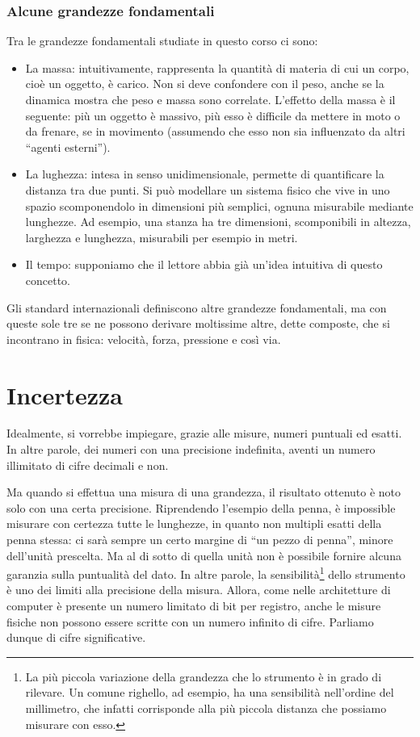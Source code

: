 \subsubsection{Alcune grandezze fondamentali}
Tra le grandezze fondamentali studiate in questo corso ci sono:
\begin{itemize}
    \item La massa: intuitivamente, rappresenta la quantità di
    materia di cui un corpo, cioè un oggetto, è carico. Non si
    deve confondere con il peso, anche se la dinamica mostra che
    peso e massa sono correlate. L'effetto della massa è il seguente:
    più un oggetto è massivo, più
    esso è difficile da mettere in moto o da frenare, se in
    movimento (assumendo che esso non sia influenzato da altri
    ``agenti esterni'').

    \item La lughezza: intesa in senso unidimensionale, permette
    di quantificare la distanza tra due punti. Si può modellare
    un sistema fisico che vive in uno spazio scomponendolo in
    dimensioni più semplici, ognuna misurabile mediante lunghezze.
    Ad esempio, una stanza ha tre dimensioni, scomponibili in
    altezza, larghezza e lunghezza, misurabili per esempio in
    metri.

    \item Il tempo: supponiamo che il lettore abbia già un'idea
    intuitiva di questo concetto.
\end{itemize}

\noindent Gli standard internazionali definiscono altre grandezze
fondamentali, ma con queste sole tre se ne possono derivare moltissime
altre, dette composte, che si incontrano in fisica: velocità, forza,
pressione e così via.

\section{Incertezza}
Idealmente, si vorrebbe impiegare, grazie alle misure, numeri puntuali ed esatti.
In altre parole, dei numeri con una precisione indefinita, aventi un numero
illimitato di cifre decimali e non.

Ma quando si effettua una misura di una grandezza, il risultato ottenuto è noto solo
con una certa precisione. Riprendendo l'esempio della penna, è impossible
misurare con certezza tutte le lunghezze, in quanto non multipli esatti della
penna stessa: ci sarà sempre un certo margine di ``un pezzo di penna'',
minore dell'unità prescelta. Ma al di sotto di quella unità non è possibile
fornire alcuna garanzia sulla puntualità del dato. In altre parole, la
sensibilità\footnote{La più piccola variazione della grandezza che lo
strumento è in grado di rilevare. Un comune righello, ad esempio, ha una
sensibilità nell'ordine del millimetro, che infatti corrisponde alla più
piccola distanza che possiamo misurare con esso.} dello strumento è uno dei limiti alla precisione
della misura. Allora, come nelle architetture di computer è presente un
numero limitato di bit per registro, anche le misure fisiche non possono
essere scritte con un numero infinito di cifre. Parliamo dunque di cifre
significative.

